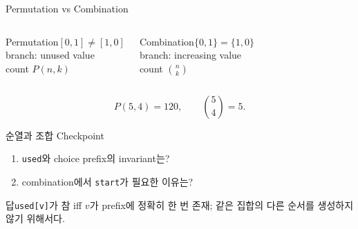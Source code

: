 \begin{frame}{Permutation vs Combination}
\begin{columns}
\begin{block}{Permutation}\([0,1]\ne[1,0]\)\\branch: unused value\\count \(P(n,k)\)\end{block}
\begin{block}{Combination}\(\{0,1\}=\{1,0\}\)\\branch: increasing value\\count \(\binom nk\)\end{block}
\end{columns}
\[
P(5,4)=120,\qquad \binom54=5.
\]
\end{frame}
\begin{frame}{순열과 조합 Checkpoint}
\begin{enumerate}\item \texttt{used}와 choice prefix의 invariant는?\item combination에서 \texttt{start}가 필요한 이유는?\end{enumerate}
\begin{exampleblock}{답}\texttt{used[v]}가 참 iff \(v\)가 prefix에 정확히 한 번 존재; 같은 집합의 다른 순서를 생성하지 않기 위해서다.\end{exampleblock}
\end{frame}
